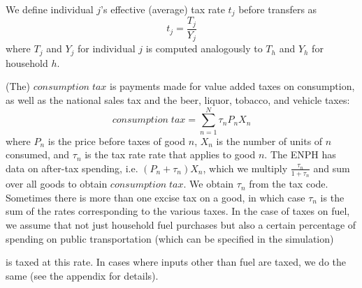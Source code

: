 \documentclass[12pt]{article}
\begin{document}
\iffalse
PITFALL (DONE):
It's unfortunate to have to specify ``tax'' and ``income''
after each of the terms in the preceding two equations,
but otherwise they are confusible --
e.g. ``personal could be personal income or a tax on it;
``labor'' and ``payroll'' could be income or taxes on that income; etc.
\fi

We define
individual $j$'s effective (average) tax rate $t_j$ before transfers as
\begin{equation}
  t_j=\frac
  {T_j}
  {Y_j}
\end{equation}
where $T_j$ and $Y_j$ for individual $j$ is computed analogously to
$T_h$ and $Y_h$ for household $h$.

\iffalse
[[AN ECONOMIST:
    Should $corporate \;tax$, described below, be in the numerator
    in the definition of $t_j$?
    --jbb]]

[[JEFF:
    BLOCKED -- might be addressed once I've renamed taxes and consumptions.

    It's confusing that, for instance,
    ``consumption'' refers to the \textit{tax} on consumption,
    rather than consumption itself.
    I'm thinking $tp_{consumption}$ would be better,
    indicating ``taxes paid on consumption''.
    (`t` would be more terse than `tp`,
    but usually `t` means a tax rate, not a peso amount.)
    --jbb]]
\fi

(The) $consumption \;tax$
is payments made for value added taxes on consumption,
as well as the national sales tax
and the beer, liquor, tobacco, and vehicle taxes:
\begin{equation}
consumption \;tax = \sum^{N}_{n=1} \tau_nP_nX_n
\end{equation}
where $P_n$ is the price before taxes of good $n$,
$X_n$ is the number of units of $n$ consumed,
and $\tau_n$ is the tax rate rate that applies to good $n$.
The ENPH has data on after-tax spending,
i.e. $(P_n+\tau_n)X_n$,
which we multiply $\frac{\tau_n}{1+\tau_n}$
and sum over all goods to obtain $consumption \;tax$.
We obtain $\tau_n$ from the tax code.
Sometimes there is more than one excise tax on a good,
in which case $\tau_n$ is the sum of
the rates corresponding to the various taxes.
In the case of taxes on fuel,
we assume that not just household fuel purchases but also
a certain percentage of spending on public transportation
(which can be specified in the simulation)
\iffalse
[[LUIS:
    I don't think it can, actually.
    Did we promise that before writing the microsimulation,
    or am I forgetting something?
    --jbb]]
\fi
is taxed at this rate.
In cases where inputs other than fuel are taxed, we do the same
(see the appendix for details).
\end{document}
